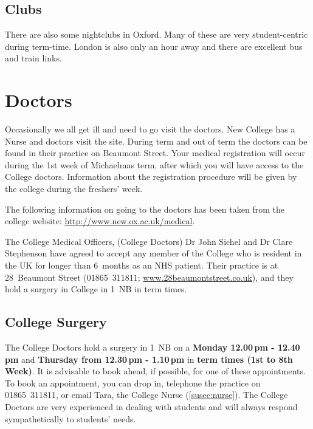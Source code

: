 \subsection{Clubs}
There are also some nightclubs in Oxford. Many of these are very student-centric during term-time. London is also only an hour away and there are excellent bus and train links.
\section{Doctors}
Occasionally we all get ill and need to go visit the doctors. New College has a Nurse and doctors visit the site. During term and out of term the doctors can be found in their practice on Beaumont Street. Your medical registration will occur during the 1st week of Michaelmas term, after which you will have access to the College doctors. Information about the registration procedure will be given by the college during the freshers’ week. 

The following information on going to the doctors has been taken from the
college website: \mbox{\url{http://www.new.ox.ac.uk/medical}}.

The College Medical Officers, (College Doctors) Dr John Sichel and Dr Clare
Stephenson have agreed to accept any member of the College who is resident in
the UK for longer than 6~months as an NHS patient. Their practice is at 28~Beaumont Street (01865~311811; \url{www.28beaumontstreet.co.uk}), and they hold
a surgery in College in 1~NB in term times.
\subsection{College Surgery}
The College Doctors hold a surgery in 1~NB on a {\textbf{Monday 12.00\,pm - 12.40\,pm}}
and {\textbf{Thursday from 12.30\,pm - 1.10\,pm}} in {\textbf{term times (1st to 8th
Week)}}. It is advisable to book ahead, if possible, for one of these
appointments. To book an appointment, you can drop in, telephone the practice on 01865~311811, or email
Tara, the College Nurse (\ref{susec:nurse}).
The College Doctors are very experienced in dealing with students and will always respond sympathetically to students' needs.
